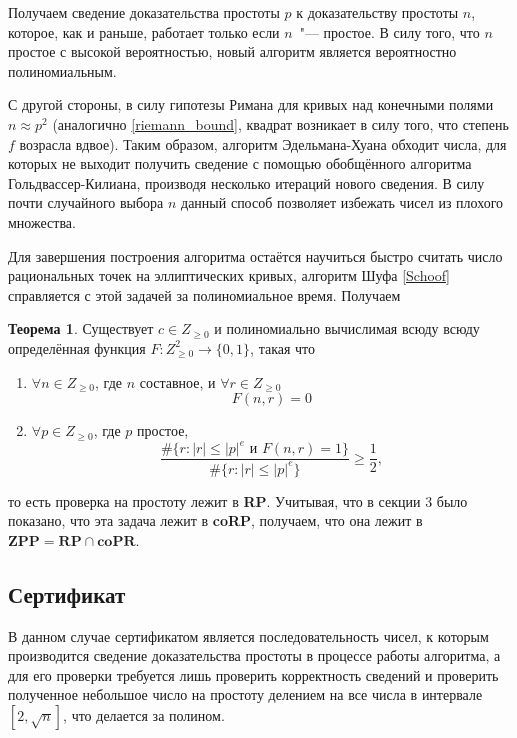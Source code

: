 \documentclass[12pt]{article}
\theoremstyle{definition}
\newtheorem{Th}{Теорема}
\numberwithin{Def}{section}
\numberwithin{Th}{section}
\numberwithin{St}{section}
\numberwithin{Cor}{section}
\begin{document}
Получаем сведение доказательства простоты $p$ к доказательству простоты $n$,
которое, как и раньше, работает только если $n$~"--- простое. В силу того,
что $n$ простое с высокой вероятностью, новый алгоритм является вероятностно
полиномиальным.

С другой стороны, в силу гипотезы Римана для кривых над конечными полями
$n\approx p^2$
(аналогично \eqref{riemann_bound}, квадрат возникает в силу того, что степень
$f$ возрасла вдвое).
Таким образом, алгоритм Эдельмана-Хуана обходит числа, для которых не выходит
получить сведение с помощью обобщённого алгоритма Гольдвассер-Килиана, производя
несколько итераций нового сведения. В силу почти случайного выбора $n$ данный
способ позволяет избежать чисел из плохого множества.

Для завершения построения алгоритма остаётся научиться быстро считать число
рациональных точек на эллиптических кривых, алгоритм Шуфа \ref{Schoof}
справляется с этой задачей за полиномиальное время. Получаем

\begin{Th}
	Существует $c\in Z_{\geqslant 0}$ и полиномиально вычислимая всюду
	всюду определённая функция $F:Z^2_{\geqslant 0}\to \{0,1\}$, такая что
	\begin{enumerate}
		\item $\forall n\in Z_{\geqslant 0}$, где $n$ составное, и
		$\forall r\in Z_{\geqslant 0}$
		$$
		F(n,r)=0
		$$
		\item $\forall p\in Z_{\geqslant 0}$, где $p$ простое,
		$$
		\dfrac{\#\{r:|r|\leqslant|p|^e\text{ и }F(n,r)=1\}}
		{\#\{r:|r|\leqslant|p|^e\}}\geqslant\dfrac 12,
		$$
	\end{enumerate}
	то есть проверка на простоту лежит в \textbf{RP}. Учитывая, что в секции 3
	было показано, что эта задача лежит в \textbf{coRP}, получаем, что она лежит
	в $\mathbf{ZPP=RP\cap coPR}$.
\end{Th}

\subsection{Сертификат}

В данном случае сертификатом является последовательность чисел, к которым
производится сведение доказательства простоты в процессе работы алгоритма,
а для его проверки требуется лишь проверить корректность сведений и 
проверить полученное небольшое число на простоту делением на все числа
в интервале $[2, \sqrt{n}]$, что делается за полином.
\end{document}
